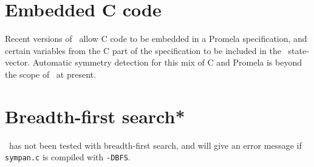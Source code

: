 \section{Embedded C code}

Recent versions of \spin\ allow C code to be embedded in a Promela
specification, and certain variables from the C part of the
specification to be included in the \spin\ state-vector.  Automatic
symmetry detection for this mix of C and Promela is beyond the scope
of \topspin\ at present.


\section{Breadth-first search*}

\topspin\ has not been tested with breadth-first search, and will give an
error message if \texttt{sympan.c} is compiled with \texttt{-DBFS}.
